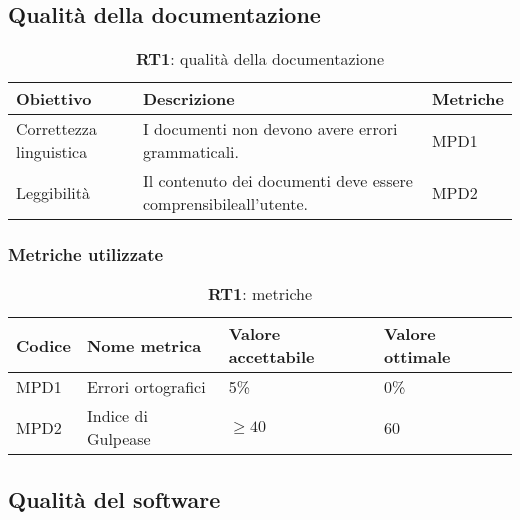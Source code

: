 \subsection{Qualità della documentazione}
\begin{table}[h!]
    \centering
    \renewcommand{\arraystretch}{1.5} %
    \begin{tabularx}{\textwidth}{|X|X|X|}\hline
    \rowcolor[HTML]{FFD700}
    \textbf{Obiettivo} & \textbf{Descrizione} & \textbf{Metriche} \\ \hline
    Correttezza linguistica & I documenti non devono avere errori grammaticali. & MPD1 \\ \hline
    Leggibilità & Il contenuto dei documenti deve essere comprensibileall’utente. & MPD2 \\ \hline
    \end{tabularx}
    \caption{\textbf{RT1}: qualità della documentazione}
\end{table}

\subsubsection{Metriche utilizzate}
\begin{table}[h!]
    \centering
    \renewcommand{\arraystretch}{1.5} %
    \begin{tabularx}{\textwidth}{|X|X|X|X|}\hline
    \rowcolor[HTML]{FFD700}
    \textbf{Codice} & \textbf{Nome metrica} & \textbf{Valore accettabile} & \textbf{Valore ottimale} \\ \hline
    MPD1 & Errori ortografici & 5\% & 0\% \\ \hline
    MPD2 & Indice di Gulpease & \( \geq 40 \) & 60 \\ \hline
    \end{tabularx}
    \caption{\textbf{RT1}: metriche}
\end{table}

\subsection{Qualità del software}
